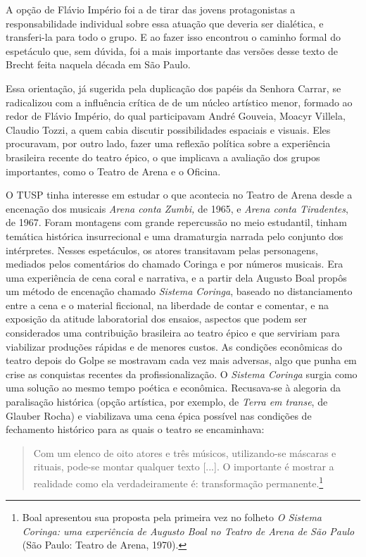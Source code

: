 A opção de Flávio Império foi a de tirar das jovens protagonistas a
responsabilidade individual sobre essa atuação que deveria ser
dialética, e transferi-la para todo o grupo. E ao fazer isso encontrou o
caminho formal do espetáculo que, sem dúvida, foi a mais importante das
versões desse texto de Brecht feita naquela década em São Paulo.

Essa orientação, já sugerida pela duplicação dos papéis da Senhora
Carrar, se radicalizou com a influência crítica de de um núcleo
artístico menor, formado ao redor de Flávio Império, do qual
participavam André Gouveia, Moacyr Villela, Claudio Tozzi, a quem cabia
discutir possibilidades espaciais e visuais. Eles procuravam, por outro
lado, fazer uma reflexão política sobre a experiência brasileira recente
do teatro épico, o que implicava a avaliação dos grupos importantes,
como o Teatro de Arena e o Oficina.

O TUSP tinha interesse em estudar o que acontecia no Teatro de Arena
desde a encenação dos musicais \textit{Arena conta Zumbi,} de 1965, e
\textit{Arena conta Tiradentes}, de 1967. Foram montagens com grande
repercussão no meio estudantil, tinham temática histórica insurrecional
e uma dramaturgia narrada pelo conjunto dos intérpretes. Nesses
espetáculos, os atores transitavam pelas personagens, mediados pelos
comentários do chamado Coringa e por números musicais. Era uma
experiência de cena coral e narrativa, e a partir dela Augusto Boal
propôs um método de encenação chamado \textit{Sistema Coringa}, baseado no
distanciamento entre a cena e o material ficcional, na liberdade de
contar e comentar, e na exposição da atitude laboratorial dos ensaios,
aspectos que podem ser considerados uma contribuição brasileira ao
teatro épico e que serviriam para viabilizar produções rápidas e de
menores custos. As condições econômicas do teatro depois do Golpe se
mostravam cada vez mais adversas, algo que punha em crise as conquistas
recentes da profissionalização. O \textit{Sistema Coringa} surgia como uma
solução ao mesmo tempo poética e econômica. Recusava-se à alegoria da
paralisação histórica (opção artística, por exemplo, de \textit{Terra em
transe}, de Glauber Rocha) e viabilizava uma cena épica possível nas
condições de fechamento histórico para as quais o teatro se encaminhava:

\begin{quote}
Com um elenco de oito atores e três músicos, utilizando-se máscaras e
rituais, pode-se montar qualquer texto {[}...{]}. O importante é mostrar
a realidade como ela verdadeiramente é: transformação
permanente.\footnote{Boal apresentou sua proposta pela primeira vez no
  folheto \textit{O Sistema Coringa: uma experiência de Augusto Boal no
  Teatro de Arena de São Paulo} (São Paulo: Teatro de Arena, 1970).}
\end{quote}

